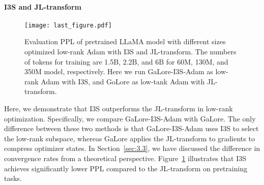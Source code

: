 \paragraph{I3S and JL-transform}
\begin{figure}[!ht]
    \centering
    \texttt{[image: last\_figure.pdf]}
    \caption{Evaluation PPL of pretrained LLaMA model with different sizes optimized low-rank Adam with I3S and JL-transform. The numbers of tokens for training are 1.5B, 2.2B, and 6B for 60M, 130M, and 350M model, respectively. Here we run GaLore-I3S-Adam as low-rank Adam with I3S, and GoLore as low-tank Adam with JL-transform.}
    \label{fig:i3s_and_jl}
\end{figure} 
Here, we demonstrate that I3S outperforms the JL-transform in low-rank optimization. Specifically, we compare GaLore-I3S-Adam with GaLore. The only difference between these two methods is that GaLore-I3S-Adam uses I3S to select the low-rank subspace, whereas GaLore applies the JL-transform to gradients to compress optimizer states. In Section~\ref{sec:3.3}, we have discussed the difference in convergence rates from a theoretical perspective. Figure~\ref{fig:i3s_and_jl} illustrates that I3S achieves significantly lower PPL compared to the JL-transform on pretraining tasks.
 
